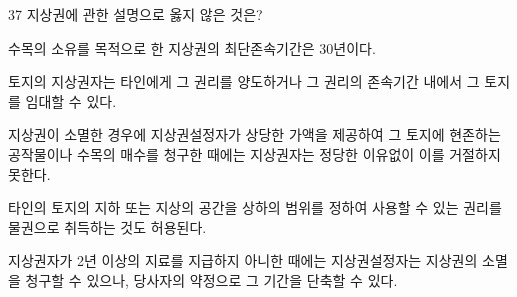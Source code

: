 \begin{question}{37}
지상권에 관한 설명으로 옳지 않은 것은?
\begin{choices}
  \item 수목의 소유를 목적으로 한 지상권의 최단존속기간은 30년이다.
  \item 토지의 지상권자는 타인에게 그 권리를 양도하거나 그 권리의 존속기간 내에서 그 토지를 임대할 수 있다.
  \item 지상권이 소멸한 경우에 지상권설정자가 상당한 가액을 제공하여 그 토지에 현존하는 공작물이나 수목의 매수를 청구한 때에는 지상권자는 정당한 이유없이 이를 거절하지 못한다.
  \item 타인의 토지의 지하 또는 지상의 공간을 상하의 범위를 정하여 사용할 수 있는 권리를 물권으로 취득하는 것도 허용된다.
  \item 지상권자가 2년 이상의 지료를 지급하지 아니한 때에는 지상권설정자는 지상권의 소멸을 청구할 수 있으나, 당사자의 약정으로 그 기간을 단축할 수 있다.
\end{choices}
\end{question}
